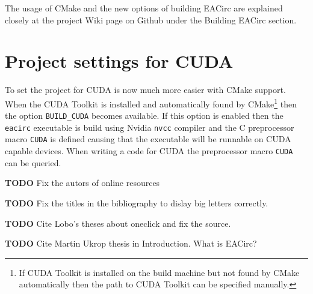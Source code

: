 \documentclass[12pt,oneside]{fithesis2}
\newcommand{\todo}{
	\noindent
	{\large\color{red}\textbf{TODO}}
}
\begin{document}
The usage of CMake and the new options of building EACirc are explained closely at the project Wiki page on Github under the Building EACirc section.

\section{Project settings for CUDA}

To set the project for CUDA is now much more easier with CMake support. When the CUDA Toolkit \cite{cuda_toolkit} is installed and automatically found by CMake\footnote{If CUDA Toolkit is installed on the build machine but not found by CMake automatically then the path to CUDA Toolkit can be specified manually.} then the option \texttt{BUILD\_CUDA} becomes available. If this option is enabled then the \texttt{eacirc} executable is build using Nvidia \cite{nvidia} \texttt{nvcc} compiler and the C preprocessor macro \texttt{CUDA} is defined causing that the executable will be runnable on CUDA capable devices. When writing a code for CUDA the preprocessor macro \texttt{CUDA} can be queried.

\printbibliography[heading=bibintoc]
\todo{Fix the autors of online resources}

\todo{Fix the titles in the bibliography to dislay big letters correctly.}

\todo{Cite Lobo's theses about oneclick and fix the source.}

\todo{Cite Martin Ukrop thesis in Introduction. What is EACirc?}
\end{document}
